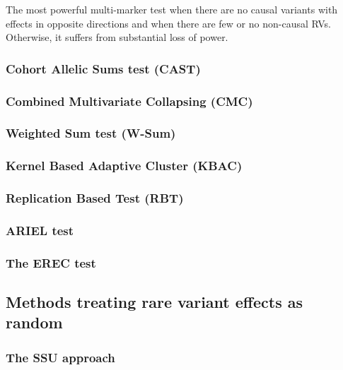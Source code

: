 \documentclass[]{book}
\theoremstyle{definition}
\theoremstyle{definition}
\theoremstyle{definition}
\theoremstyle{remark}
\begin{document}
The most powerful multi-marker test when there are no causal variants
with effects in opposite directions and when there are few or no
non-causal RVs. Otherwise, it suffers from substantial loss of power.

\subsubsection{Cohort Allelic Sums test
(CAST)}\label{cohort-allelic-sums-test-cast}

\subsubsection{Combined Multivariate Collapsing
(CMC)}\label{combined-multivariate-collapsing-cmc}

\subsubsection{Weighted Sum test (W-Sum)}\label{weighted-sum-test-w-sum}

\subsubsection{Kernel Based Adaptive Cluster
(KBAC)}\label{kernel-based-adaptive-cluster-kbac}

\subsubsection{Replication Based Test
(RBT)}\label{replication-based-test-rbt}

\subsubsection{ARIEL test}\label{ariel-test}

\subsubsection{The EREC test}\label{the-erec-test}

\subsection{Methods treating rare variant effects as
random}\label{methods-treating-rare-variant-effects-as-random}

\subsubsection{The SSU approach}\label{the-ssu-approach}
\end{document}
